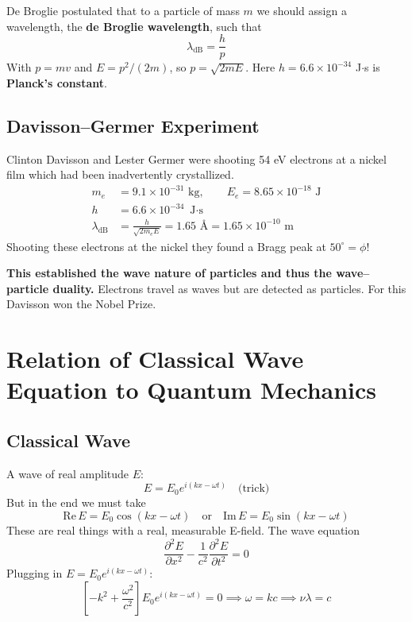 \documentclass[11pt]{report}
\begin{document}
De Broglie postulated that to a particle of mass $m$ we should assign a wavelength, the \textbf{de Broglie wavelength}, such that
\begin{equation}
\boxed{\lambda_{\text{dB}} = \frac{h}{p}}
\end{equation}
With $p = mv$ and $E = p^2/(2m)$, so $p = \sqrt{2mE}$. Here $h = 6.6\times 10^{-34}$ J$\cdot$s is \textbf{Planck's constant}.

\subsection*{Davisson--Germer Experiment}

Clinton Davisson and Lester Germer were shooting 54 eV electrons at a nickel film which had been inadvertently crystallized.
\begin{align}
m_e &= 9.1\times 10^{-31}\text{ kg}, \qquad E_e = 8.65\times 10^{-18}\text{ J} \\
h &= 6.6\times 10^{-34}\text{ J$\cdot$s} \\
\lambda_{\text{dB}} &= \frac{h}{\sqrt{2 m_e E}} = 1.65\text{ \AA{}} = 1.65\times 10^{-10}\text{ m}
\end{align}
Shooting these electrons at the nickel they found a Bragg peak at $50^\circ = \phi$!

\textbf{This established the wave nature of particles and thus the wave--particle duality.} Electrons travel as waves but are detected as particles. For this Davisson won the Nobel Prize.

\section{Relation of Classical Wave Equation to Quantum Mechanics}

\subsection*{Classical Wave}

A wave of real amplitude $E$:
\begin{equation}
E = E_0 e^{i(kx-\omega t)} \quad \text{(trick)}
\end{equation}
But in the end we must take
\begin{equation}
\mathrm{Re}\,E = E_0\cos(kx-\omega t) \quad \text{or} \quad \mathrm{Im}\,E = E_0\sin(kx-\omega t)
\end{equation}
These are real things with a real, measurable E-field. The wave equation
\begin{equation}
\frac{\partial^2 E}{\partial x^2} - \frac{1}{c^2}\frac{\partial^2 E}{\partial t^2} = 0
\end{equation}
Plugging in $E = E_0 e^{i(kx-\omega t)}$:
\begin{equation}
\left[-k^2 + \frac{\omega^2}{c^2}\right] E_0 e^{i(kx-\omega t)} = 0 \implies \omega = kc \implies \nu\lambda = c
\end{equation}
\end{document}
